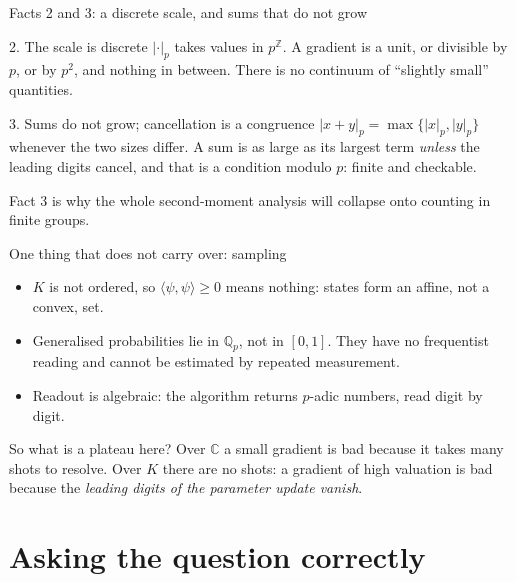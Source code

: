 \documentclass[aspectratio=169,compress]{beamer}
\newcommand{\Qp}{\mathbb{Q}_p}
\newcommand{\padicnorm}[1]{\left|#1\right|_p}
\newcommand{\inner}[2]{\langle #1, #2\rangle}
\begin{document}
\begin{frame}{Facts 2 and 3: a discrete scale, and sums that do not grow}
  \begin{block}{2. The scale is discrete}
    $\padicnorm{\cdot}$ takes values in $p^{\mathbb{Z}}$. A gradient is a unit,
    or divisible by $p$, or by $p^{2}$, and nothing in between. There is no
    continuum of ``slightly small'' quantities.
  \end{block}
  \begin{block}{3. Sums do not grow; cancellation is a congruence}
    $\padicnorm{x+y}=\max\{\padicnorm{x},\padicnorm{y}\}$ whenever the two
    sizes differ. A sum is as large as its largest term \emph{unless} the
    leading digits cancel, and that is a condition modulo $p$: finite and
    checkable.
  \end{block}
  \vspace{0.3em}
  Fact 3 is why the whole second-moment analysis will collapse onto
  \alert{counting in finite groups}.
\end{frame}

\begin{frame}{One thing that does not carry over: sampling}
  \begin{itemize}
    \item $K$ is not ordered, so $\inner\psi\psi\ge0$ means nothing: states
      form an affine, not a convex, set.
    \item Generalised probabilities lie in $\Qp$, not in $[0,1]$. They have no
      frequentist reading and \alert{cannot be estimated by repeated
      measurement}.
    \item Readout is algebraic: the algorithm returns $p$-adic numbers, read
      digit by digit.
  \end{itemize}
  \begin{alertblock}{So what is a plateau here?}
    Over $\mathbb{C}$ a small gradient is bad because it takes many shots to
    resolve. Over $K$ there are no shots: a gradient of high valuation is bad
    because the \emph{leading digits of the parameter update vanish}.
  \end{alertblock}
\end{frame}

\section[Question]{Asking the question correctly}
\end{document}
